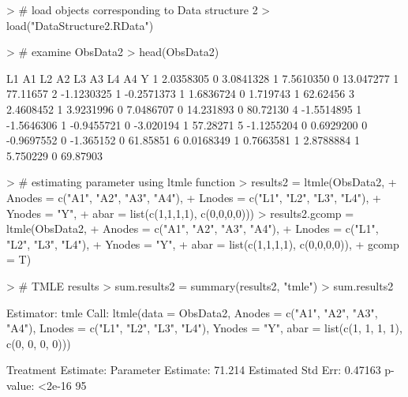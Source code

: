 \documentclass[answers]{exam}
\begin{document}
\begin{solution}
\begin{Schunk}
\begin{Sinput}
> # load objects corresponding to Data structure 2
> load("DataStructure2.RData")
\end{Sinput}
\end{Schunk}
\begin{Schunk}
\begin{Sinput}
> # examine ObsData2
> head(ObsData2)
\end{Sinput}
\begin{Soutput}
          L1 A1         L2 A2         L3 A3        L4 A4        Y
1  2.0358305  0  3.0841328  1  7.5610350  0 13.047277  1 77.11657
2 -1.1230325  1 -0.2571373  1  1.6836724  0  1.719743  1 62.62456
3  2.4608452  1  3.9231996  0  7.0486707  0 14.231893  0 80.72130
4 -1.5514895  1 -1.5646306  1 -0.9455721  0 -3.020194  1 57.28271
5 -1.1255204  0  0.6929200  0 -0.9697552  0 -1.365152  0 61.85851
6  0.0168349  1  0.7663581  1  2.8788884  1  5.750229  0 69.87903
\end{Soutput}
\end{Schunk}
\begin{Schunk}
\begin{Sinput}
> # estimating parameter using ltmle function
> results2 = ltmle(ObsData2, 
+                  Anodes = c("A1", "A2", "A3", "A4"), 
+                  Lnodes = c("L1", "L2", "L3", "L4"), 
+                  Ynodes = "Y", 
+                  abar = list(c(1,1,1,1), c(0,0,0,0)))
> results2.gcomp = ltmle(ObsData2, 
+                        Anodes = c("A1", "A2", "A3", "A4"), 
+                        Lnodes = c("L1", "L2", "L3", "L4"), 
+                        Ynodes = "Y", 
+                        abar = list(c(1,1,1,1), c(0,0,0,0)),
+                        gcomp = T)
\end{Sinput}
\end{Schunk}
\begin{Schunk}
\begin{Sinput}
> # TMLE results
> sum.results2 = summary(results2, "tmle")
> sum.results2
\end{Sinput}
\begin{Soutput}
Estimator:  tmle 
Call:
ltmle(data = ObsData2, Anodes = c("A1", "A2", "A3", "A4"), Lnodes = c("L1", 
    "L2", "L3", "L4"), Ynodes = "Y", abar = list(c(1, 1, 1, 1), 
    c(0, 0, 0, 0)))

Treatment Estimate:
   Parameter Estimate:  71.214 
    Estimated Std Err:  0.47163 
              p-value:  <2e-16 
    95%


\end{Soutput}
\end{Schunk}
\end{solution}
\end{document}
